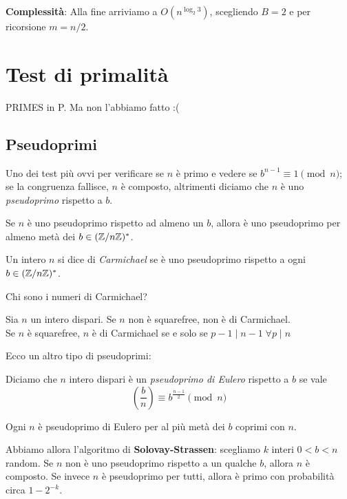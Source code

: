 \documentclass[a4paper]{book}
\begin{document}
    \textbf{Complessità}: Alla fine arriviamo a $O(n^{\log_2 3})$, scegliendo $B=2$ e per ricorsione $m=n/2$.

    \section{Test di primalità}
    PRIMES in P. Ma non l'abbiamo fatto :(

    \subsection{Pseudoprimi}

    Uno dei test più ovvi per verificare se $n$ è primo e vedere se $b^{n-1}\equiv 1\pmod n$; se la congruenza fallisce, $n$ è composto, altrimenti diciamo che $n$ è uno \emph{pseudoprimo} rispetto a $b$.

    \begin{proposition}
        Se $n$ è uno pseudoprimo rispetto ad almeno un $b$, allora è uno pseudoprimo per almeno metà dei $b\in(\mathbb{Z}/n\mathbb{Z})^\ast$.
    \end{proposition}

    \begin{definition}
        Un intero $n$ si dice di \emph{Carmichael} se è uno pseudoprimo rispetto a ogni $b\in(\mathbb{Z}/n\mathbb{Z})^\ast$.
    \end{definition}

    Chi sono i numeri di Carmichael?
    \begin{proposition}
        Sia $n$ un intero dispari. Se $n$ non è squarefree, non è di Carmichael.\\
        Se $n$ è squarefree, $n$ è di Carmichael se e solo se $p-1\mid n-1\;\forall p\mid n$
    \end{proposition}

    Ecco un altro tipo di pseudoprimi:
    \begin{definition}
        Diciamo che $n$ intero dispari è un \emph{pseudoprimo di Eulero} rispetto a $b$ se vale $$\left( \frac b n \right)\equiv b^{\frac{n-1}{2}}\pmod n$$
    \end{definition}

    \begin{proposition}
        Ogni $n$ è pseudoprimo di Eulero per al più metà dei $b$ coprimi con $n$.
    \end{proposition}

    Abbiamo allora l'algoritmo di \textbf{Solovay-Strassen}: scegliamo $k$ interi $0<b<n$ random. Se $n$ non è uno pseudoprimo rispetto a un qualche $b$, allora $n$ è composto. Se invece $n$ è pseudoprimo per tutti, allora è primo con probabilità circa $1-2^{-k}$.
\end{document}
